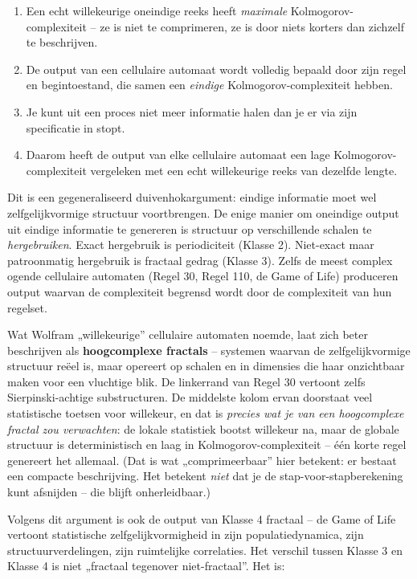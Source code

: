 \documentclass[11pt, twoside, openright]{book}
\begin{document}
\begin{enumerate}
  \item Een echt willekeurige oneindige reeks heeft \textit{maximale} Kolmogorov-complexiteit -- ze is niet te comprimeren, ze is door niets korters dan zichzelf te beschrijven.
  \item De output van een cellulaire automaat wordt volledig bepaald door zijn regel en begintoestand, die samen een \textit{eindige} Kolmogorov-complexiteit hebben.
  \item Je kunt uit een proces niet meer informatie halen dan je er via zijn specificatie in stopt.
  \item Daarom heeft de output van elke cellulaire automaat een lage Kolmogorov-complexiteit vergeleken met een echt willekeurige reeks van dezelfde lengte.
\end{enumerate}

Dit is een gegeneraliseerd duivenhokargument: eindige informatie moet wel zelfgelijkvormige structuur voortbrengen. De enige manier om oneindige output uit eindige informatie te genereren is structuur op verschillende schalen te \textit{hergebruiken}. Exact hergebruik is periodiciteit (Klasse 2). Niet-exact maar patroonmatig hergebruik is fractaal gedrag (Klasse 3). Zelfs de meest complex ogende cellulaire automaten (Regel 30, Regel 110, de Game of Life) produceren output waarvan de complexiteit begrensd wordt door de complexiteit van hun regelset.

Wat Wolfram „willekeurige” cellulaire automaten noemde, laat zich beter beschrijven als \textbf{hoogcomplexe fractals} -- systemen waarvan de zelfgelijkvormige structuur reëel is, maar opereert op schalen en in dimensies die haar onzichtbaar maken voor een vluchtige blik. De linkerrand van Regel 30 vertoont zelfs Sierpinski-achtige substructuren. De middelste kolom ervan doorstaat veel statistische toetsen voor willekeur, en dat is \textit{precies wat je van een hoogcomplexe fractal zou verwachten}: de lokale statistiek bootst willekeur na, maar de globale structuur is deterministisch en laag in Kolmogorov-complexiteit -- één korte regel genereert het allemaal. (Dat is wat „comprimeerbaar” hier betekent: er bestaat een compacte beschrijving. Het betekent \textit{niet} dat je de stap-voor-stapberekening kunt afsnijden -- die blijft onherleidbaar.)

Volgens dit argument is ook de output van Klasse 4 fractaal -- de Game of Life vertoont statistische zelfgelijkvormigheid in zijn populatiedynamica, zijn structuurverdelingen, zijn ruimtelijke correlaties. Het verschil tussen Klasse 3 en Klasse 4 is niet „fractaal tegenover niet-fractaal”. Het is:
\end{document}
